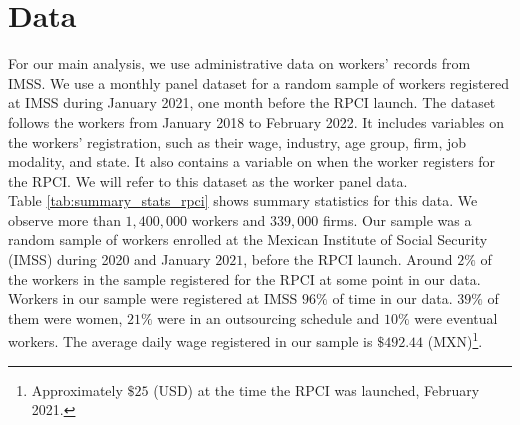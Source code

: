 \documentclass[10pt, oneside]{book}
\begin{document}
\chapter{Data} \label{data}

For our main analysis, we use administrative data on workers' records from IMSS. We use a monthly panel dataset for a random sample of workers registered at IMSS during January 2021, one month before the RPCI launch. The dataset follows the workers from January 2018 to February 2022. It includes variables on the workers' registration, such as their wage, industry, age group, firm, job modality, and state. It also contains a variable on when the worker registers for the RPCI. We will refer to this dataset as the worker panel data. \\ 

Table \ref{tab:summary_stats_rpci} shows summary statistics for this data. We observe more than $1,400,000$ workers and $339,000$ firms. Our sample was a random sample of workers enrolled at the Mexican Institute of Social Security (IMSS) during 2020 and January $2021$, before the RPCI launch. Around $2\%$ of the workers in the sample registered for the RPCI at some point in our data. Workers in our sample were registered at IMSS $96\%$ of time in our data. $39\%$ of them were women, $21\%$ were in an outsourcing schedule and $10\%$ were eventual workers. The average daily wage registered in our sample is $\$492.44$ (MXN)\footnote{Approximately $\$25$ (USD) at the time the RPCI was launched, February 2021.}. \\
\end{document}
